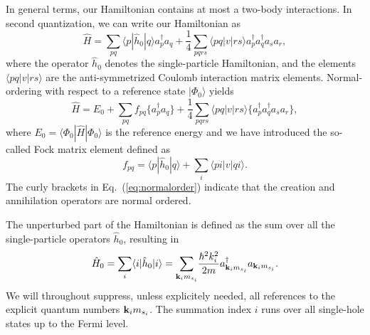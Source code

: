 \documentclass[aps,prc,twocolumn,showpacs,floatfix,nofootinbib,preprintnumbers,superscriptaddress,amsmath,amssymb]{revtex4-1}
\begin{document}
In general terms, our Hamiltonian contains at most a two-body
interactions. In second quantization, we can write our Hamiltonian as
\begin{equation}
\hat{H}= \sum_{pq}\langle p | \hat{h}_0 | q \rangle a_p^{\dagger} a_q + \frac{1}{4}\sum_{pqrs}\langle pq |v| r s \rangle a_p^{\dagger} a_q^{\dagger} a_s a_r,
\label{eq:ourHamiltonian}
\end{equation} 
where the operator $\hat{h}_0$ denotes the single-particle
Hamiltonian, and the elements $\langle pq|v|rs\rangle$ are the
anti-symmetrized Coulomb interaction matrix elements.  Normal-ordering
with respect to a reference state $|\Phi_0\rangle$ yields
\begin{equation}
\hat{H}=E_0 + \sum_{pq}f_{pq}\lbrace a_p^{\dagger} a_q\rbrace + \frac{1}{4}\sum_{pqrs}\langle pq |v| r s \rangle \lbrace a_p^{\dagger} a_q^{\dagger} a_s a_r \rbrace,
\label{eq:normalorder}
\end{equation}
where $E_0=\langle\Phi_0| \hat{H}| \Phi_0\rangle$ is the reference energy
and we have introduced the so-called  Fock matrix element defined as
\begin{equation}
f_{pq} = \langle p|\hat{h}_0| q \rangle + \sum\limits_{i} \langle pi |v| qi\rangle.
\label{eq:fockelement}
\end{equation}
The curly brackets in Eq.~(\ref{eq:normalorder}) indicate that the
creation and annihilation operators are normal ordered.

The unperturbed part
of the Hamiltonian is defined as the sum over all the single-particle
operators $\hat{h}_0$, resulting in
\[
\hat{H}_{0}=\sum_i\langle i|\hat{h}_0|i \rangle= {\displaystyle\sum_{{\bf k}_{i}m_{s_i}}}
\frac{\hbar^{2}k_i^{2}}{2m}a_{{\bf k}_{i}m_{s_i}}^{\dagger}
a_{{\bf k}_{i}m_{s_i}}.
\]
We will throughout suppress, unless explicitely needed, all references
to the explicit quantum numbers ${\bf k}_{i}m_{s_i}$. The summation
index $i$ runs over all single-hole states up to the Fermi level.
\end{document}
